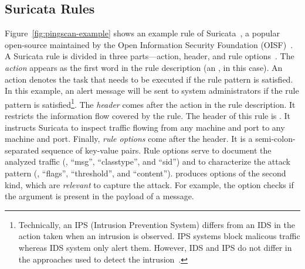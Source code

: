 \documentclass[sigconf,review, anonymous]{acmart}
\begin{document}
\subsection{Suricata Rules}
\label{sec:example-suricata-rules}

Figure~\ref{fig:pingscan-example} shows an example rule of
Suricata~\cite{suricata}, a popular open-source \nids{} maintained by
the Open Information Security Foundation (OISF)~\cite{oisf}.  A
Suricata rule is divided in three parts---action, header, and rule
options~\cite{suri-rule-format}. The \emph{action} appears as the
first word in the rule description (an , in this
case). An action denotes the task that needs to be executed if the
rule pattern is satisfied.  In this example, an alert message will be
sent to system administrators if the rule pattern is
satisfied\footnote{Technically, an IPS (Intrusion Prevention System)
  differs from an IDS in the action taken when an intrusion is
  observed. IPS systems block malicous traffic whereas IDS system only
  alert them. However, IDS and IPS do not differ in the approaches
  used to detect the intrusion~\cite{ids-ips}.}. The
\emph{header} comes after the action in the rule description. It
restricts the information flow covered by the rule. The header of this
rule is . It instructs Suricata to
inspect  traffic flowing from any machine and port to any
machine and port. Finally, \emph{rule
  options} come after the header. It is a semi-colon-separated
sequence of key-value pairs. Rule options serve to document the
analyzed traffic (\eg{}, ``msg'', ``classtype'', and ``sid'') and to
characterize the attack pattern (\eg, ``flags'', ``threshold'', and
``content''). \tname{} produces options of the second kind, which are
\emph{relevant} to capture the attack. For example, the option
 checks if the argument is present in the
payload of a message.
\end{document}
